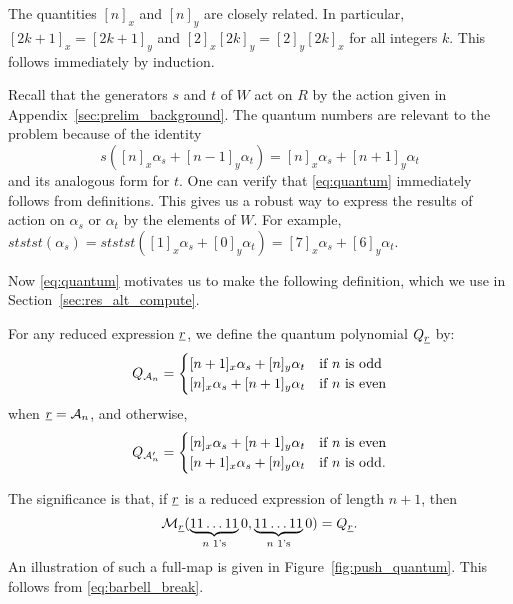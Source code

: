 The quantities $[n]_x$ and $[n]_y$ are closely related.  In particular, $[2k+1]_x = [2k+1]_y$ and $[2]_x[2k]_y = [2]_y[2k]_x$ for all integers $k$.  This follows immediately by induction.

Recall that the generators $s$ and $t$ of $W$ act on $R$ by the action given in Appendix~\ref{sec:prelim_background}.  The quantum numbers are relevant to the problem because of the identity
\begin{equation}
	s([n]_x\alpha_s + [n-1]_y\alpha_t) = [n]_x\alpha_s + [n+1]_y\alpha_t
	\label{eq:quantum}
\end{equation}
and its analogous form for $t$.  One can verify that \eqref{eq:quantum} immediately follows from definitions.  This gives us a robust way to express the results of action on $\alpha_s$ or $\alpha_t$ by the elements of $W$.  For example, $ststst(\alpha_s) = ststst([1]_x\alpha_s + [0]_y\alpha_t) = [7]_x\alpha_s + [6]_y\alpha_t$.

Now \eqref{eq:quantum} motivates us to make the following definition, which we use in Section~\ref{sec:res_alt_compute}.
\begin{definition}
	For any reduced expression $\ul r$, we define the quantum polynomial $Q_{\ul r}$ by:
	\[
		Q_{\AA_n} = 
		\begin{cases}
			[n+1]_x \alpha_s + [n]_y \alpha_t & \text{if $n$ is odd} \\
			[n]_x \alpha_s + [n+1]_y \alpha_t & \text{if $n$ is even}
		\end{cases}
	\]
	when $\ul r = \AA_n$, and otherwise,
	\[
		Q_{\AA_n'} =
		\begin{cases}
			[n]_x \alpha_s + [n+1]_y \alpha_t & \text{if $n$ is even} \\
			[n+1]_x \alpha_s + [n]_y \alpha_t & \text{if $n$ is odd}.
		\end{cases}
	\]
\end{definition}

The significance is that, if $\ul r$ is a reduced expression of length $n+1$, then \[ \MM_{\ul r} ( \underbrace{11\dots11}_{\text{$n$ 1's}}0, \underbrace{11\dots11}_{\text{$n$ 1's}}0 ) = Q_{\ul r}. \]
An illustration of such a full-map is given in Figure~\ref{fig:push_quantum}.
This follows from \eqref{eq:barbell_break}.  

